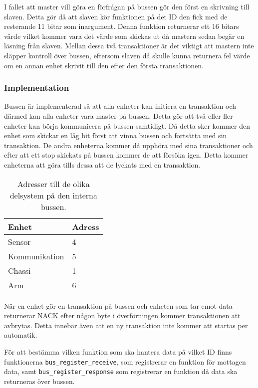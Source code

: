 I fallet att master vill göra en förfrågan på bussen gör den först en skrivning till slaven. Detta gör då att slaven kör funktionen på det ID den fick med de resterande 11 bitar som inargument. Denna funktion returnerar ett 16 bitars värde vilket kommer vara det värde som skickas ut då mastern sedan begär en läsning från slaven. Mellan dessa två transaktioner är det viktigt att mastern inte släpper kontroll över bussen, eftersom slaven då skulle kunna returnera fel värde om en annan enhet skrivit till den efter den första transaktionen.

\subsubsection{Implementation}
\label{sec:bus-implementation}
Bussen är implementerad så att alla enheter kan initiera en transaktion och därmed kan alla enheter vara master på bussen. Detta gör att två eller fler enheter kan börja kommunicera på bussen samtidigt. Då detta sker kommer den enhet som skickar en låg bit först att vinna bussen och fortsätta med sin transaktion. De andra enheterna kommer då upphöra med sina transaktioner och efter att ett stop skickats på bussen kommer de att försöka igen. Detta kommer enheterna att göra tills dessa att de lyckats med en transaktion.

\begin{table}[H]
\centering
\label{adress-buss}
\begin{tabularx}{0.5\textwidth}{|X|X|}
\hline
\textbf{Enhet} & \textbf{Adress} \\ \hline
Sensor & 4 \\ \hline
Kommunikation & 5 \\ \hline
Chassi & 1 \\ \hline
Arm & 6 \\ \hline
\end{tabularx}
\caption{Adresser till de olika delsystem på den interna bussen.}
\end{table}

När en enhet gör en transaktion på bussen och enheten som tar emot data returnerar NACK efter någon byte i överförningen kommer transaktionen att avbrytas. Detta innebär även att en ny transaktion inte kommer att startas per automatik.

För att bestämma vilken funktion som ska hantera data på vilket ID finns funktionerna \verb|bus_register_receive|, som registrerar en funktion för mottagen data, samt \verb|bus_register_response| som registrerar en funktion då data ska returneras över bussen.

